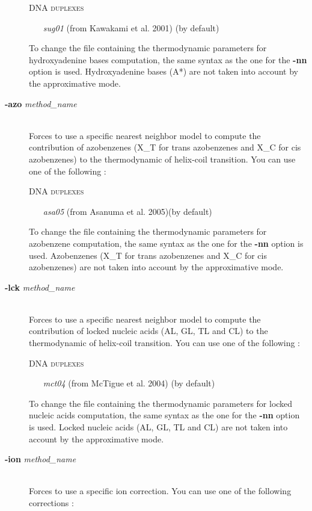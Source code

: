 \documentclass{article}
\begin{document}
\begin{description}
  \textsc{DNA duplexes}
    \begin{itemize}
    \item [\textit{sug01}] (from Kawakami et al. 2001) (by default)
    \end{itemize}
  To change the file containing the thermodynamic parameters for hydroxyadenine bases computation, the same syntax as the one for the \textbf{-nn} option is used.
  Hydroxyadenine bases (A*) are not taken into account by the approximative mode.
\item [\textbf{-azo} \textit{method\_name}]\mbox{}\\ 
  Forces to use a specific nearest neighbor model to compute the contribution of azobenzenes (X\_T for trans azobenzenes and X\_C for cis azobenzenes) to the thermodynamic 
  of helix-coil transition. 
  You can use one of the following :
  
  \textsc{DNA duplexes}
    \begin{itemize}
    \item [\textit{asa05}] (from Asanuma et al. 2005)(by default)
    \end{itemize}
  To change the file containing the thermodynamic parameters for azobenzene computation, the same syntax as the one for the \textbf{-nn} option is used.
  Azobenzenes (X\_T for trans azobenzenes and X\_C for cis azobenzenes) are not taken into account by the approximative mode.
\item [\textbf{-lck} \textit{method\_name}]\mbox{}\\ 
  Forces to use a specific nearest neighbor model to compute the contribution of locked nucleic acids (AL, GL, TL and CL) to the thermodynamic 
  of helix-coil transition. 
  You can use one of the following :
  
  \textsc{DNA duplexes}
    \begin{itemize}
    \item [\textit{mct04}] (from McTigue et al. 2004) (by default)
    \end{itemize}
  To change the file containing the thermodynamic parameters for locked nucleic acids computation, the same syntax as the one for the \textbf{-nn} option is used.
  Locked nucleic acids (AL, GL, TL and CL) are not taken into account by the approximative mode.
\item [\textbf{-ion} \textit{method\_name}]\mbox{}\\ 
  Forces to use a specific ion correction. You can use one of the following corrections : 
    

\end{description}
\end{document}
